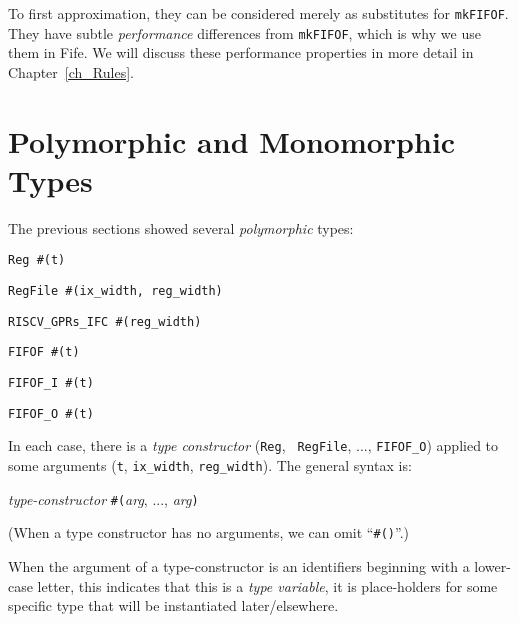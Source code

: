To first approximation, they can be considered merely as substitutes
for {\tt mkFIFOF}.  They have subtle \emph{performance} differences
from {\tt mkFIFOF}, which is why we use them in Fife.  We will discuss
these performance properties in more detail in Chapter~\ref{ch_Rules}.


\section{Polymorphic and Monomorphic Types}

\label{Sec_Polymorphic_Types}



The previous sections showed several \emph{polymorphic} types:

{\small
\begin{tightlist}
 \item \verb|Reg #(t)|
 \item \verb|RegFile #(ix_width, reg_width)|
 \item \verb|RISCV_GPRs_IFC #(reg_width)|
 \item \verb|FIFOF #(t)|
 \item \verb|FIFOF_I #(t)|
 \item \verb|FIFOF_O #(t)|
\end{tightlist}
}

In each case, there is a \emph{type constructor} ({\tt Reg}, {\tt
RegFile}, ..., {\tt FIFOF\_O}) applied to some arguments ({\tt t},
{\tt ix\_width}, {\tt reg\_width}).  The general syntax is:

\begin{tabbing}
\hmm \emph{type-constructor} {\tt \#(}\emph{arg}, ..., \emph{arg}{\tt )}
\end{tabbing}

(When a type constructor has no arguments, we can omit ``{\tt \#()}''.)

When the argument of a type-constructor is an identifiers beginning
with a lower-case letter, this indicates that this is a \emph{type
variable}, {\ie} it is place-holders for some specific type that will
be instantiated later/elsewhere.

